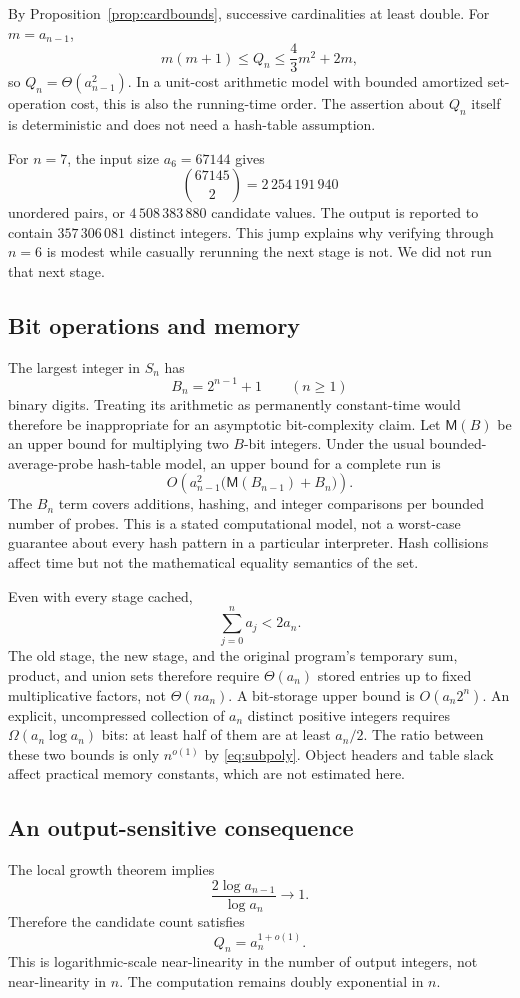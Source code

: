 \documentclass[11pt,a4paper]{article}
\theoremstyle{definition}
\theoremstyle{remark}
\begin{document}
By Proposition~\ref{prop:cardbounds}, successive cardinalities at least
double. For $m=a_{n-1}$,
\[
 m(m+1)\le Q_n\le\frac43m^2+2m,
\]
so $Q_n=\Theta(a_{n-1}^2)$. In a unit-cost arithmetic model with bounded
amortized set-operation cost, this is also the running-time order.
The assertion about $Q_n$ itself is deterministic and does not need a
hash-table assumption.

For $n=7$, the input size $a_6=67144$ gives
\[
 \binom{67145}{2}=2\,254\,191\,940
\]
unordered pairs, or $4\,508\,383\,880$ candidate values. The output is
reported to contain $357\,306\,081$ distinct integers. This jump explains
why verifying through $n=6$ is modest while casually rerunning the next
stage is not. We did not run that next stage.

\subsection{Bit operations and memory}
The largest integer in $S_n$ has
\[
 B_n=2^{n-1}+1\qquad(n\ge1)
\]
binary digits. Treating its arithmetic as permanently constant-time would
therefore be inappropriate for an asymptotic bit-complexity claim.
Let $\mathsf M(B)$ be an upper bound for multiplying two $B$-bit integers.
Under the usual bounded-average-probe hash-table model, an upper bound for
a complete run is
\begin{equation}\label{eq:bitcost}
 O\!\left(a_{n-1}^2\bigl(\mathsf M(B_{n-1})+B_n\bigr)\right).
\end{equation}
The $B_n$ term covers additions, hashing, and integer comparisons per
bounded number of probes. This is a stated computational model, not a
worst-case guarantee about every hash pattern in a particular interpreter.
Hash collisions affect time but not the mathematical equality semantics
of the set.

Even with every stage cached,
\[
 \sum_{j=0}^{n}a_j<2a_n.
\]
The old stage, the new stage, and the original program's temporary sum,
product, and union sets therefore require $\Theta(a_n)$ stored entries
up to fixed multiplicative factors, not $\Theta(na_n)$.
A bit-storage upper bound is $O(a_n2^n)$. An explicit, uncompressed
collection of $a_n$ distinct positive integers requires
$\Omega(a_n\log a_n)$ bits: at least half of them are at least $a_n/2$.
The ratio between these two bounds is only $n^{o(1)}$ by
\eqref{eq:subpoly}. Object headers and table slack affect practical memory
constants, which are not estimated here.

\subsection{An output-sensitive consequence}
The local growth theorem implies
\[
 \frac{2\log a_{n-1}}{\log a_n}\longrightarrow1.
\]
Therefore the candidate count satisfies
\begin{equation}\label{eq:outputcost}
 Q_n=a_n^{1+o(1)}.
\end{equation}
This is logarithmic-scale near-linearity in the number of output integers,
not near-linearity in $n$. The computation remains doubly exponential in
$n$.
\end{document}
